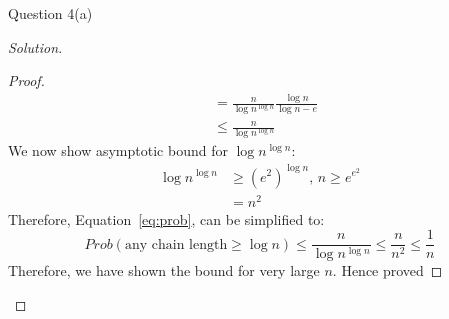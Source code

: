 \begin{solution}{Question 4(a)}
\begin{proof}[Solution]
\begin{proof}
\begin{equation}
\begin{split}
                                                     &=\frac{n}{\log{n}^{\log{n}}} \frac{\log{n}}{\log{n}-e}\\
                                                     &\leq \frac{n}{\log{n}^{\log{n}}}
            \end{split}
        \end{equation}
        We now show asymptotic bound for $\log{n}^{\log{n}}$:
        \begin{equation}
            \begin{split}
                \log{n}^{\log{n}} &\geq (e^2)^{\log{n}}\text{, }n \geq e^{e^2}\\
                                &= n^2
            \end{split}
        \end{equation}
        Therefore, Equation~\ref{eq:prob}, can be simplified to:
        \begin{equation}
            Prob(\text{any chain length} \geq \log{n}) \leq \frac{n}{\log{n}^{\log{n}}} \leq \frac{n}{n^2} \leq \frac{1}{n}
        \end{equation}
        Therefore, we have shown the bound for very large $n$. Hence proved
        \end{proof}
        
        
        
        
        
    \end{proof}
\end{solution}
